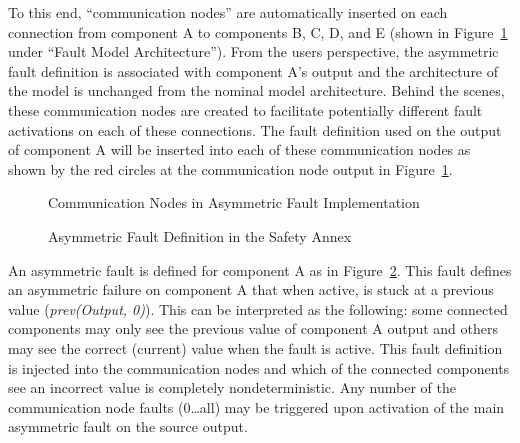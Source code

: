 To this end, ``communication nodes'' are automatically inserted on each connection from component A to components B, C, D, and E (shown in Figure~\ref{fig:commNodes} under ``Fault Model Architecture''). From the users perspective, the asymmetric fault definition is associated with component A's output and the architecture of the model is unchanged from the nominal model architecture. Behind the scenes, these communication nodes are created to facilitate potentially different fault activations on each of these connections. The fault definition used on the output of component A will be inserted into each of these communication nodes as shown by the red circles at the communication node output in Figure~\ref{fig:commNodes}.
\begin{figure}[!htb]
        \caption{\label{fig:commNodes} Communication Nodes in Asymmetric Fault Implementation}
\end{figure}

\begin{figure}[!htb]
        \caption{\label{fig:asymFaultDef} Asymmetric Fault Definition in the Safety Annex}
\end{figure}

An asymmetric fault is defined for component A as in Figure~\ref{fig:asymFaultDef}. This fault defines an asymmetric failure on component A that when active, is stuck at a previous value (\textit{prev(Output, 0)}). This can be interpreted as the following: some connected components may only see the previous value of component A output and others may see the correct (current) value when the fault is active. This fault definition is injected into the communication nodes and which of the connected components see an incorrect value is completely nondeterministic. Any number of the communication node faults (0…all) may be triggered upon activation of the main asymmetric fault on the source output.




